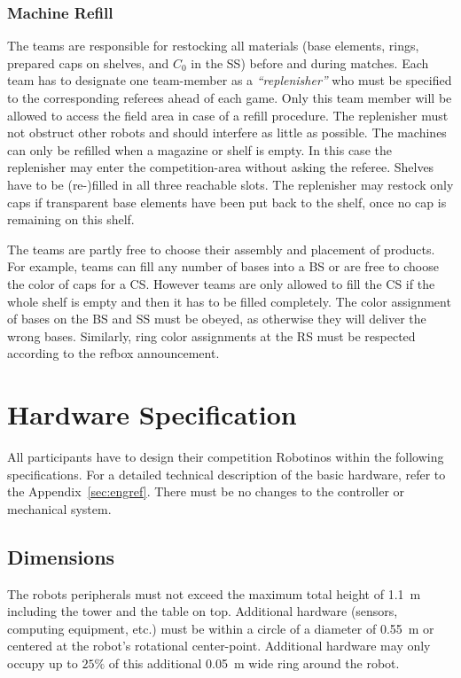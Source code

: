 \documentclass[12pt,twoside]{article}
\begin{document}
\subsubsection{Machine Refill}
\label{sec:machine-refill}
The teams are responsible for restocking all materials (base elements,
rings, prepared caps on shelves, and $C_0$ in the \ac{SS}) before and
during matches.
Each team has to designate one team-member as a \textit{``replenisher''} who
must be specified to the corresponding referees ahead of each
game. Only this team member will be allowed to access the field area in case of
a refill procedure. The replenisher must not obstruct other
robots and should interfere as little as possible.  The machines can only be
refilled when a magazine or shelf is empty. In this case the replenisher may
enter the competition-area without asking the referee. Shelves have to be
(re-)filled in all three reachable slots. %
The replenisher may restock only caps if transparent base elements have been put
back to the shelf, once no cap is remaining on this shelf.

The teams are partly free to choose their assembly and placement of products.
For example, teams can fill any number of bases into a \ac{BS} or are free
to choose the color of caps for a \ac{CS}.
However teams are only allowed to fill the \ac{CS} if the
whole shelf is empty and then it has to be filled completely.
The color assignment of bases on the \ac{BS} and \ac{SS} must be obeyed,
as otherwise they will deliver the wrong bases.
Similarly, ring color assignments at the \ac{RS} must be
respected according to the \ac{refbox} announcement.


\section{Hardware Specification}
\label{sec:robotino}

All participants have to design their competition Robotinos within the
following specifications. For a detailed technical description of the
basic hardware, refer to the Appendix~\ref{sec:engref}.
There must be no changes to the controller or mechanical system.

\subsection{Dimensions}
The robots peripherals must not exceed the maximum total height of
\SI{1.1}{\metre} including the tower and the table on top. Additional
hardware (sensors, computing equipment, etc.)  must be within a circle
of a diameter of \SI{0.55}{\metre} or centered at the robot's rotational
center-point. Additional hardware may only occupy up to $25\%$ of this
additional \SI{0.05}{\metre} wide ring around the
robot.
\end{document}
